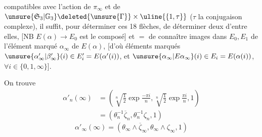 compatibles avec l'action de $\pi_\infty$ et de
$\unsure{\mathfrak S_3|\mathbb G_3}\deleted{\unsure{\Gamma}}
\times\uline{\{1,\tau\}}$
($\tau$   la conjugaison complexe),
il suffit, pour déterminer ces 18 flèches, de déterminer deux d'entre elles,
 
[NB $E(\alpha)\longrightarrow E_0$ est le composé]
et $=$ de connaître  images dans $E_0,E_1$ de l'élément
marqué $\alpha_\infty$ de $E(\alpha)$,
[d'où éléments marqués
$\unsure{\alpha'_\infty|\beta'_\infty}(i)\in E'_i=E(\alpha'(i))$,
et $\unsure{\alpha_\infty|E\alpha_\infty}(i)\in E_i=E(\alpha(i))$,
$\forall i\in\{0,1,\infty\}$].

On trouve
\[
\begin{aligned}
\alpha'_n(\infty)&=
\left(\sqrt[n]{\tfrac12}\exp\frac{-\pi i}{n},
\sqrt[n]{\tfrac12}\exp\frac{\pi i}{n},1\right)\\
&=(\theta_n^{-1}\overline\zeta_n,\theta_n^{-1}\zeta_n,1)
\end{aligned}
\]
\[
\alpha'_\infty(\infty)=
(\theta_\infty\wedge\overline\zeta_\infty,
\theta_\infty\wedge\zeta_\infty,1)
\]

